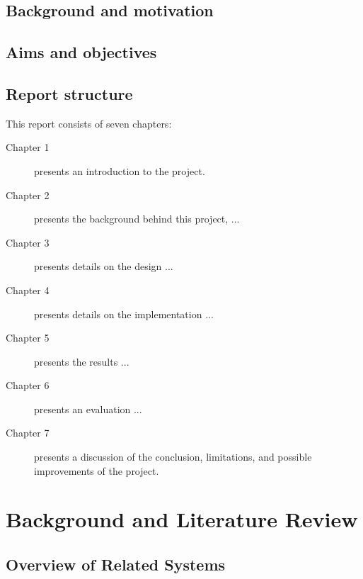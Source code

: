     \subsection{Background and motivation}
    
    \subsection{Aims and objectives}
    
    
    \subsection{Report structure} %
    
      This report consists of seven chapters:
      \begin{description}
      \item[Chapter 1] presents an introduction to the project.
      \item[Chapter 2] presents the background behind this project, ...
      \item[Chapter 3] presents details on the design ...
      \item[Chapter 4] presents details on the implementation ...
      \item[Chapter 5] presents the results ...
      \item[Chapter 6] presents an evaluation  ...
      \item[Chapter 7] presents a discussion of the conclusion, limitations, and possible improvements of the project.
    \end{description}
    
    
    \section{Background and Literature Review} %
    
      \subsection{Overview of Related Systems}
    
